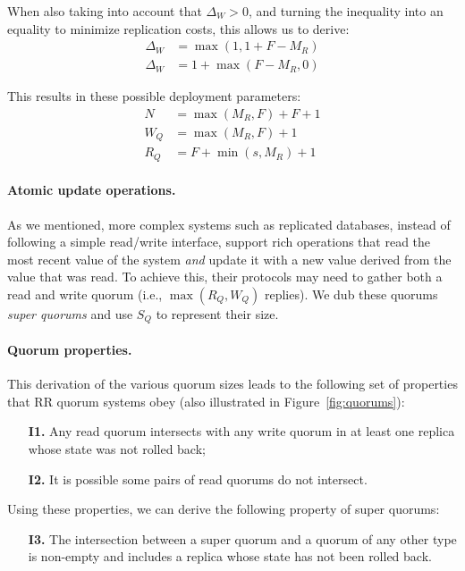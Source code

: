When also taking into account that $\Delta_W > 0$, and turning
the inequality into an equality to minimize replication costs,
this allows us to derive:
\begin{align} \label{eq:deployment2}
  \Delta_W &=  \max(1,1 + F - M_R)\\
  \Delta_W &=  1 + \max(F - M_R,0)
\end{align}

This results in these possible deployment parameters:
\begin{align} \label{eq:deploymentfinal}
    N &= \max(M_R, F) + F + 1  \\
    W_Q &= \max(M_R, F) + 1 \\
    R_Q &= F + \min(s, M_R) + 1 \label{eq:proof3}
\end{align}

\paragraph{Atomic update operations.}
As we mentioned, more complex systems such as replicated
databases, instead of following a simple read/write interface,
support rich operations that read the most recent value of the
system \emph{and} update it with a new value derived from the
value that was read. To achieve this, their protocols may need to
gather both a read and write quorum (i.e., $\max(R_Q, W_Q)$
replies). We dub these quorums \emph{super quorums} and use $S_Q$
to represent their size.

\paragraph{Quorum properties.} This derivation of the various quorum
sizes leads to the following set of properties that \ac{RR} quorum
systems obey (also illustrated in Figure~\ref{fig:quorums}):

\begin{enumerate}
    \item[\textbf{I1.}] Any read quorum intersects with any write
        quorum in at least one replica whose state was not rolled
        back;
    \item[\textbf{I2.}] It is possible some pairs of read quorums
        do not intersect.
\end{enumerate}

Using these properties, we can derive the following
property of super quorums:

\begin{enumerate}
    \item[\textbf{I3.}] The intersection between a super quorum
        and a quorum of any other type is non-empty and includes
        a replica whose state has not been rolled back.
\end{enumerate}

